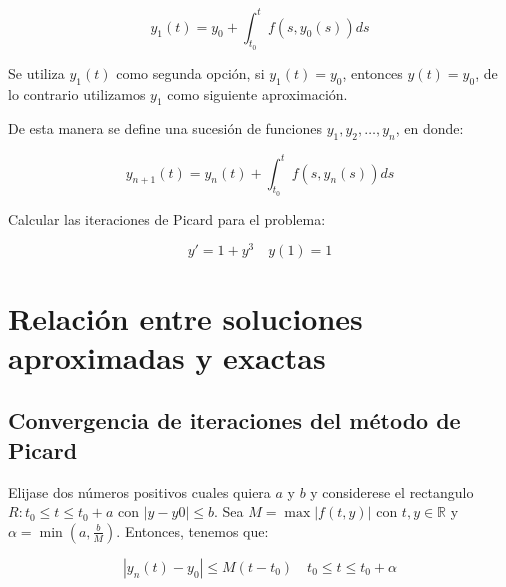 		\begin{equation*}
			y_1(t) = y_0 + \int_{t_0}^t f(s, y_0(s)) ds
		\end{equation*}

		Se utiliza $y_1(t)$ como segunda opción, si $y_1(t) = y_0$, entonces $y(t) = y_0$, de lo contrario utilizamos $y_1$ como siguiente aproximación.

		De esta manera se define una sucesión de funciones $y_1, y_2, \dots, y_n$, en donde:

		\begin{equation}
			y_{n+1}(t) = y_n(t) + \int_{t_0}^t f(s, y_n(s)) ds
		\end{equation}

		\begin{ejemplo}
		\end{ejemplo}

		\begin{ejercicio}
			Calcular las iteraciones de Picard para el problema:

			\begin{equation*}
				y' = 1 + y^3 \quad y(1) = 1
			\end{equation*}
		\end{ejercicio}

\newpage
\section{Relación entre soluciones aproximadas y exactas}

	\subsection{Convergencia de iteraciones del método de Picard}

		\begin{lema}
			Elijase dos números positivos cuales quiera $a$ y $b$ y considerese el rectangulo $R \colon t_0 \leq t \leq t_0 + a$ con $|y -y0| \leq b$.
			Sea $M = \max{|f(t, y)|}$ con $t, y \in \mathbb{R}$ y $\alpha = \min{(a, \frac{b}{M})}$.
			Entonces, tenemos que:

			\begin{equation}
				|y_n(t) - y_0| \leq M (t - t_0) \quad t_0 \leq t \leq t_0 + \alpha
			\end{equation}
		\end{lema}


